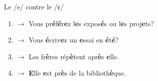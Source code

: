 \begin{frame}{Le /e/ contre le /ɛ/}
  \begin{enumerate}
    \item[/e/] $\to$ Vous pr\textbf{é}f\textbf{é}r\textbf{e}z l\textbf{e}s expos\textbf{é}s ou l\textbf{e}s proj\textbf{e}ts?
    \item[/e/] $\to$ Vous \textbf{é}criv\textbf{e}z un \textbf{e}ssai en \textbf{é}t\textbf{é}?
    \item[/ɛ/] $\to$ Les fr\textbf{è}res rép\textbf{è}tent apr\textbf{è}s \textbf{e}lle.
    \item[/ɛ/] $\to$ \textbf{E}lle \textbf{e}st pr\textbf{è}s de la biblioth\textbf{è}que.
  \end{enumerate}
\end{frame}